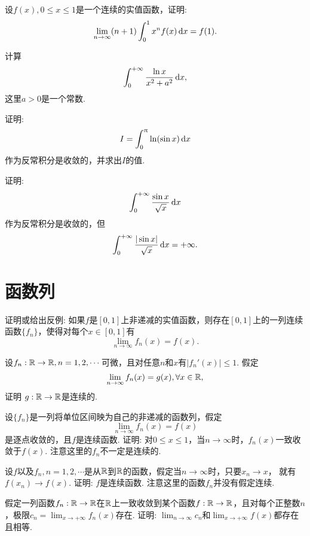 \begin{example}
  设$f(x),0\le x\le1$是一个连续的实值函数，证明:
  \[ \lim_{n\to\infty}(n+1)\int_0^1x^nf(x)\,\dx = f(1). \]
\end{example}

\begin{example}
  计算
  \[ \int_0^{+\infty}\frac{\ln x}{x^2+a^2}\,\mathrm dx, \]
  这里$a>0$是一个常数.
\end{example}

\begin{example}
  证明:
  \[ I=\int_0^\uppi\ln(\sin x)\,\mathrm dx \]
  作为反常积分是收敛的，并求出$I$的值.
\end{example}

\begin{example}
  证明:
  \[\int_0^{+\infty}\frac{\sin x}{\sqrt x}\,\mathrm dx\]
  作为反常积分是收敛的，但
  \[\int_0^{+\infty}\frac{|\sin x|}{\sqrt x}\,\mathrm dx
  =+\infty.\]
\end{example}

\section{函数列}
\begin{example}
  证明或给出反例: 如果$f$是$[0,1]$上非递减的实值函数，则存在$[0,1]$上的一列连续函数$\{f_n\}$，使得对每个$x\in[0,1]$有
  \[ \lim_{n\to\infty}f_n(x) = f(x). \]
\end{example}

\begin{example}
  设$f_n:\mathbb R\to\mathbb R,n=1,2,\cdots$可微，且对任意$n$和$x$有$|f_n'(x)|\le1$. 假定
  \[ \lim_{n\to\infty}f_n(x) = g(x),\forall x\in\MR, \]
  证明 $g:\mathbb R\to\mathbb R$是连续的.
\end{example}

\begin{example}
  设$\{f_n\}$是一列将单位区间映为自己的非递减的函数列，假定
  \[ \lim_{n\to\infty}f_n(x) = f(x) \]
  是逐点收敛的，且$f$是连续函数. 证明: 对$0\le x\le1$，当$n\to\infty$时，$f_n(x)$一致收敛于$f(x)$. 注意这里的$f_n$不一定是连续的.
\end{example}

\begin{example}
  设$f$以及$f_n,n=1,2,\cdots$是从$\mathbb R$到$\mathbb R$的函数，假定当$n\to\infty$时，只要$x_n\to x$， 就有$f(x_n)\to f(x)$. 证明: $f$是连续函数. 注意这里的函数$f_n$并没有假定连续.
\end{example}

\begin{example}
  假定一列函数$f_n:\mathbb R\to\mathbb R$在$\mathbb R$上一致收敛到某个函数$f:\mathbb R\to\mathbb R$，且对每个正整数$n$，极限$c_n=\lim_{x\to+\infty}f_n(x)$存在. 证明: $\lim_{n\to\infty}c_n$和$\lim_{x\to+\infty}f(x)$都存在且相等.
\end{example}

